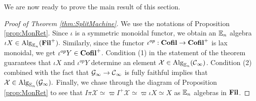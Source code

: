 We are now ready to prove the main result of this section.

\begin{proof}[Proof of Theorem \ref{thm:SplitMachine}]
We use the notations of Proposition \ref{prop:MonRet}.  Since $\iota$ is a symmetric monoidal functor, we obtain an $\operatorname{\mathbb{E}}_n$ algebra $\iota X \in \operatorname{\text{Alg}}_{\operatorname{\mathbb{E}}_n}(\operatorname{\textbf{Fil}}^+).$  
Similarly, since the functor $\iota^{op}: \operatorname{\textbf{Cofil}} \to \operatorname{\textbf{Cofil}}^+$ is lax monoidal, we get $\iota^{op}Y \in \operatorname{\textbf{Cofil}}^+$.  %
Condition (1) in the statement of the theorem guarantees that $\iota X$ and $\iota^{op}Y$ determine an element $\mathcal{X} \in \operatorname{\text{Alg}}_{\operatorname{\mathbb{E}}_n}(\operatorname{\mathcal{C}}_{\infty})$.  Condition (2) combined with the fact that $\mathcal{G}_\infty \to \operatorname{\mathcal{C}}_\infty$ is fully faithful implies that $\mathcal{X} \in \operatorname{\text{Alg}}_{\operatorname{\mathbb{E}}_n}(\mathcal{G}_\infty).$  Finally, we chase through the diagram of Proposition \ref{prop:MonRet} to see that $I\pi \mathcal{X} \simeq \varpi I^+ \mathcal{X} \simeq \varpi \iota X \simeq X$ as $\operatorname{\mathbb{E}}_n$ algebras in $\operatorname{\textbf{Fil}}$.  
\end{proof}




